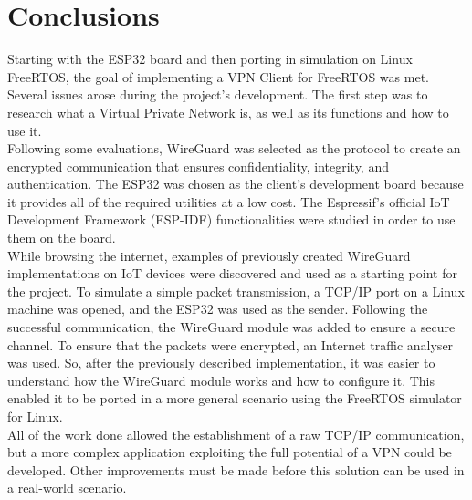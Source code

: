 \chapter{Conclusions}
Starting with the ESP32 board and then porting in simulation on Linux FreeRTOS, the goal of implementing a VPN Client for FreeRTOS was met.
Several issues arose during the project's development. The first step was to research what a Virtual Private Network is, as well as its functions and how to use it.
\\Following some evaluations, WireGuard was selected as the protocol to create an encrypted communication that ensures confidentiality, integrity, and authentication.
The ESP32 was chosen as the client's development board because it provides all of the required utilities at a low cost.
The Espressif's official IoT Development Framework (ESP-IDF) functionalities were studied in order to use them on the board.
\\While browsing the internet, examples of previously created WireGuard implementations on IoT devices were discovered and used as a starting point for the project.
To simulate a simple packet transmission, a TCP/IP port on a Linux machine was opened, and the ESP32 was used as the sender.
Following the successful communication, the WireGuard module was added to ensure a secure channel.
To ensure that the packets were encrypted, an Internet traffic analyser was used.
So, after the previously described implementation, it was easier to understand how the WireGuard module works and how to configure it. This enabled it to be ported in a more general scenario using the FreeRTOS simulator for Linux.
\\All of the work done allowed the establishment of a raw TCP/IP communication, but a more complex application exploiting the full potential of a VPN could be developed.
Other improvements must be made before this solution can be used in a real-world scenario.
